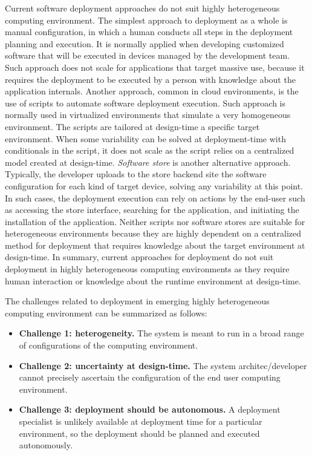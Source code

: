 Current software deployment approaches do not suit highly heterogeneous computing environment.
The simplest approach to deployment as a whole is manual configuration, in which a human conducts all steps in the deployment planning and execution. It is normally applied when developing customized software that will be executed in devices managed by the development team. Such approach does not scale for applications that target massive use, because it requires the deployment to be executed by a person with knowledge about the application internals\cite{andersson_jesper_deployment_2000}.
Another approach, common in cloud environments, is the use of scripts to automate software deployment execution\cite{spinellis_dont_2012}. Such approach is normally used in virtualized environments that simulate a very homogeneous environment. The scripts are tailored at design-time a specific target environment. When some variability can be solved at deployment-time with conditionals in the script, it does not scale as the script relies on a centralized model created at design-time.
\emph{Software store} is another alternative approach. Typically, the developer uploads to the store backend site the software configuration for each kind of target device, solving any variability at this point.
In such cases, the deployment execution can rely on actions by the end-user such as accessing the store interface, searching for the application, and initiating the installation of the application.
Neither scripts nor software stores are suitable for heterogeneous environments because they are highly dependent on a centralized method for deployment that requires knowledge about the target environment at design-time. In summary, current approaches for deployment do not suit deployment in highly heterogeneous computing environments as they require human interaction or knowledge about the runtime environment at design-time.

The challenges related to deployment in emerging highly heterogeneous computing environment can be summarized as follows:

\begin{itemize}
  \item \textbf{ Challenge 1: heterogeneity.}  The system is meant to run in a broad range of configurations of the computing environment.

  \item \textbf{ Challenge 2: uncertainty at design-time.} The system architec/developer cannot precisely ascertain the configuration of the end user computing environment.

  \item \textbf{ Challenge 3: deployment should be autonomous.} A deployment specialist is unlikely available at deployment time for a particular environment, so the deployment should be planned and executed autonomously.
\end{itemize}

